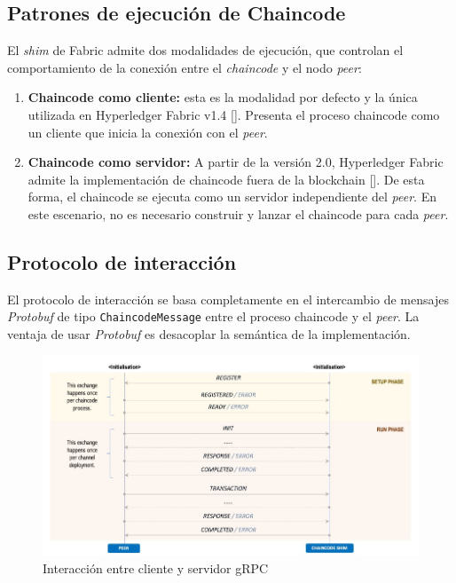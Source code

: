 \subsection*{Patrones de ejecución de Chaincode}

El \textit{shim} de Fabric admite dos modalidades de ejecución, que controlan el comportamiento de la conexión entre el \textit{chaincode} y el nodo \textit{peer}:

\begin{enumerate}
\item \textbf{Chaincode como cliente:} esta es la modalidad por defecto y la única utilizada en Hyperledger Fabric v1.4 [\cite{hlf-internals}]. Presenta el proceso chaincode como un cliente que inicia la conexión con el \textit{peer}.

\item \textbf{Chaincode como servidor:} A partir de la versión 2.0, Hyperledger Fabric admite la implementación de chaincode fuera de la blockchain [\cite{hlf-internals}]. De esta forma, el chaincode se ejecuta como un servidor independiente del \textit{peer}. En este escenario, no es necesario construir y lanzar el chaincode para cada \textit{peer}.
\end{enumerate}

\subsection*{Protocolo de interacción}
El protocolo de interacción se basa completamente en el intercambio de mensajes \textit{Protobuf} de tipo \texttt{ChaincodeMessage} entre el proceso chaincode y el \textit{peer}. La ventaja de usar \textit{Protobuf} es desacoplar la semántica de la implementación.

\begin{figure}[tbph]
\centering
\includegraphics[width=\textwidth]{Images/interaction_protocol}
\caption{Interacción entre cliente y servidor gRPC}
\label{fig:interactionprotocol}
\end{figure}

